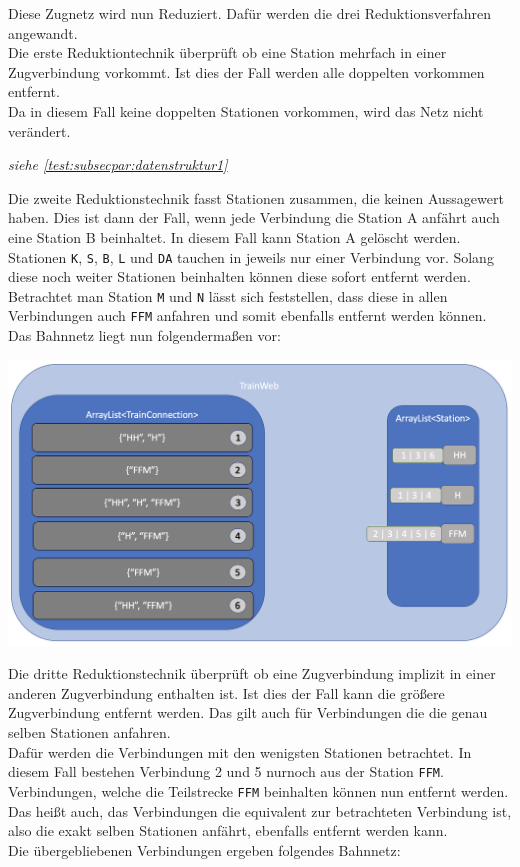 Diese Zugnetz wird nun Reduziert. Dafür werden die drei Reduktionsverfahren angewandt.\\
Die erste Reduktiontechnik überprüft ob eine Station mehrfach in einer Zugverbindung vorkommt. Ist dies der Fall werden alle doppelten vorkommen entfernt.\\
Da in diesem Fall keine doppelten Stationen vorkommen, wird das Netz nicht verändert.
\begin{center}
    \textit{siehe \ref{test:subsecpar:datenstruktur1}}
\end{center}

Die zweite Reduktionstechnik fasst Stationen zusammen, die keinen Aussagewert haben. Dies ist dann der Fall, wenn jede Verbindung die Station A anfährt auch eine Station B beinhaltet. In diesem Fall kann Station A gelöscht werden.\\
Stationen \texttt{K}, \texttt{S}, \texttt{B}, \texttt{L} und \texttt{DA} tauchen in jeweils nur einer Verbindung vor. Solang diese noch weiter Stationen beinhalten können diese sofort entfernt werden. Betrachtet man Station \texttt{M} und \texttt{N} lässt sich feststellen, dass diese in allen Verbindungen auch \texttt{FFM} anfahren und somit ebenfalls entfernt werden können.\\
Das Bahnnetz liegt nun folgendermaßen vor:\\

\begin{center}
    \includegraphics[width=\linewidth]{images/Programmdurchlauf/Datenstruktur02.png}
    \label{test:subsecpar:datenstruktur2}
\end{center}

Die dritte Reduktionstechnik überprüft ob eine Zugverbindung implizit in einer anderen Zugverbindung enthalten ist. Ist dies der Fall kann die größere Zugverbindung entfernt werden. Das gilt auch für Verbindungen die die genau selben Stationen anfahren.\\
Dafür werden die Verbindungen mit den wenigsten Stationen betrachtet. In diesem Fall bestehen Verbindung 2 und 5 nurnoch aus der Station \texttt{FFM}. Verbindungen, welche die Teilstrecke \texttt{FFM} beinhalten können nun entfernt werden. Das heißt auch, das Verbindungen die equivalent zur betrachteten Verbindung ist, also die exakt selben Stationen anfährt, ebenfalls entfernt werden kann.\\
Die übergebliebenen Verbindungen ergeben folgendes Bahnnetz:\\

